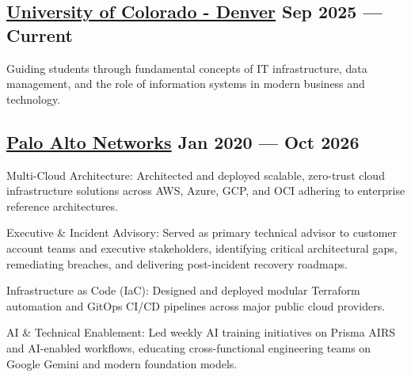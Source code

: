 \vspace*{5pt}
\subsection{{\href{https://business.ucdenver.edu/about/our-people/franklin-diaz}{University of Colorado - Denver} \hfill Sep 2025 --- Current}}
\vspace*{5pt}
{\footnotesize
}
\begin{zitemize}
\item Guiding students through fundamental concepts of IT infrastructure, data management, and the role of information systems in modern business and technology.
\end{zitemize}

\vspace*{5pt}
\subsection{{\href{https://www.paloaltonetworks.com/about-us}{Palo Alto Networks} \hfill Jan 2020 --- Oct 2026}}
\vspace*{5pt}
{\footnotesize
}
\vspace*{5pt}
\begin{zitemize}
	\item Multi-Cloud Architecture: Architected and deployed scalable, zero-trust cloud infrastructure solutions across AWS, Azure, GCP, and OCI adhering to enterprise reference architectures.
	\item Executive \& Incident Advisory: Served as primary technical advisor to customer account teams and executive stakeholders, identifying critical architectural gaps, remediating breaches, and delivering post-incident recovery roadmaps.
	\item Infrastructure as Code (IaC): Designed and deployed modular Terraform automation and GitOps CI/CD pipelines across major public cloud providers.
	\item AI \& Technical Enablement: Led weekly AI training initiatives on Prisma AIRS and AI-enabled workflows, educating cross-functional engineering teams on Google Gemini and modern foundation models.
\end{zitemize}

\vspace*{5pt}
